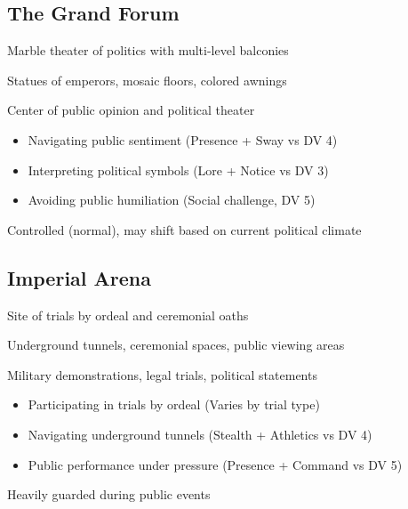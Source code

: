 \documentclass[11pt]{article}
\newenvironment{location}[1]{\begin{description}[leftmargin=*,style=standard]\item[\textbf{#1}]}{\end{description}}
\begin{document}
\subsection{The Grand Forum}
\begin{location}{The Grand Forum}
\item[Description:] Marble theater of politics with multi-level balconies
\item[Features:] Statues of emperors, mosaic floors, colored awnings
\item[Political Significance:] Center of public opinion and political theater
\item[Challenges:] 
  \begin{itemize}
    \item Navigating public sentiment (Presence + Sway vs DV 4)
    \item Interpreting political symbols (Lore + Notice vs DV 3)
    \item Avoiding public humiliation (Social challenge, DV 5)
  \end{itemize}
\item[Position:] Controlled (normal), may shift based on current political climate
\end{location}

\subsection{Imperial Arena}
\begin{location}{Imperial Arena}
\item[Description:] Site of trials by ordeal and ceremonial oaths
\item[Features:] Underground tunnels, ceremonial spaces, public viewing areas
\item[Uses:] Military demonstrations, legal trials, political statements
\item[Challenges:] 
  \begin{itemize}
    \item Participating in trials by ordeal (Varies by trial type)
    \item Navigating underground tunnels (Stealth + Athletics vs DV 4)
    \item Public performance under pressure (Presence + Command vs DV 5)
  \end{itemize}
\item[Security:] Heavily guarded during public events
\end{location}
\end{document}
